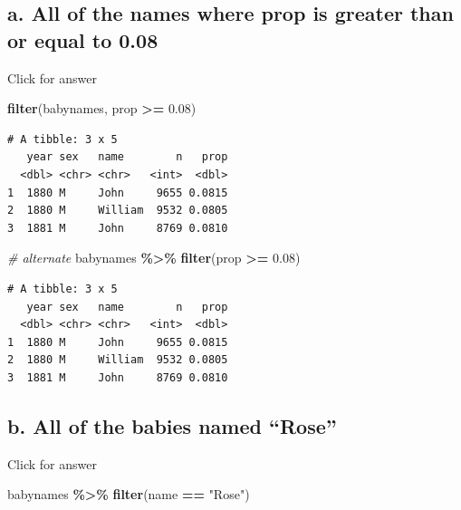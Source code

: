 \documentclass[
]{book}
\newenvironment{Shaded}{\begin{snugshade}}{\end{snugshade}}
\newcommand{\CommentTok}[1]{\textcolor[rgb]{0.56,0.35,0.01}{\textit{#1}}}
\newcommand{\FloatTok}[1]{\textcolor[rgb]{0.00,0.00,0.81}{#1}}
\newcommand{\FunctionTok}[1]{\textcolor[rgb]{0.13,0.29,0.53}{\textbf{#1}}}
\newcommand{\NormalTok}[1]{#1}
\newcommand{\SpecialCharTok}[1]{\textcolor[rgb]{0.81,0.36,0.00}{\textbf{#1}}}
\newcommand{\StringTok}[1]{\textcolor[rgb]{0.31,0.60,0.02}{#1}}
\begin{document}
\hypertarget{a.-all-of-the-names-where-prop-is-greater-than-or-equal-to-0.08}{%
\subsection{a. All of the names where prop is greater than or equal to 0.08}\label{a.-all-of-the-names-where-prop-is-greater-than-or-equal-to-0.08}}

Click for answer

\begin{Shaded}
\begin{Highlighting}[]
\FunctionTok{filter}\NormalTok{(babynames, prop }\SpecialCharTok{\textgreater{}=} \FloatTok{0.08}\NormalTok{)}
\end{Highlighting}
\end{Shaded}

\begin{verbatim}
# A tibble: 3 x 5
   year sex   name        n   prop
  <dbl> <chr> <chr>   <int>  <dbl>
1  1880 M     John     9655 0.0815
2  1880 M     William  9532 0.0805
3  1881 M     John     8769 0.0810
\end{verbatim}

\begin{Shaded}
\begin{Highlighting}[]
\CommentTok{\# alternate}
\NormalTok{babynames }\SpecialCharTok{\%\textgreater{}\%} \FunctionTok{filter}\NormalTok{(prop }\SpecialCharTok{\textgreater{}=} \FloatTok{0.08}\NormalTok{)}
\end{Highlighting}
\end{Shaded}

\begin{verbatim}
# A tibble: 3 x 5
   year sex   name        n   prop
  <dbl> <chr> <chr>   <int>  <dbl>
1  1880 M     John     9655 0.0815
2  1880 M     William  9532 0.0805
3  1881 M     John     8769 0.0810
\end{verbatim}

\hypertarget{b.-all-of-the-babies-named-rose}{%
\subsection{b. All of the babies named ``Rose''}\label{b.-all-of-the-babies-named-rose}}

Click for answer

\begin{Shaded}
\begin{Highlighting}[]
\NormalTok{babynames }\SpecialCharTok{\%\textgreater{}\%} \FunctionTok{filter}\NormalTok{(name }\SpecialCharTok{==} \StringTok{"Rose"}\NormalTok{)}
\end{Highlighting}
\end{Shaded}
\end{document}
